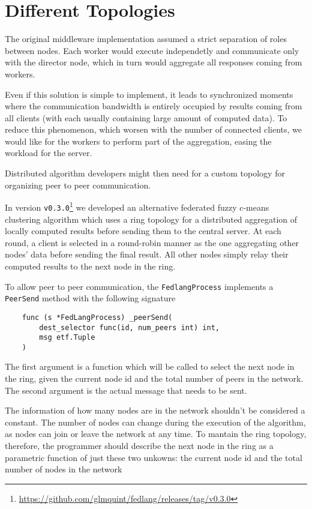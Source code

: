 \chapter{Different Topologies}

The original middleware implementation assumed a strict separation of roles between nodes. Each worker would execute independetly and communicate only with the director node, which in turn would aggregate all responses coming from workers.

Even if this solution is simple to implement, it leads to synchronized moments where the communication bandwidth is entirely occupied by results coming from all clients (with each usually containing large amount of computed data). To reduce this phenomenon, which worsen with the number of connected clients, we would like for the workers to perform part of the aggregation, easing the workload for the server. 

Distributed algorithm developers might then need for a custom topology for organizing peer to peer communication.

In version \texttt{v0.3.0}\footnote{\url{https://github.com/glmquint/fedlang/releases/tag/v0.3.0}} we developed an alternative federated fuzzy c-means clustering algorithm which uses a ring topology for a distributed aggregation of locally computed results before sending them to the central server. At each round, a client is selected in a round-robin manner as the one aggregating other nodes' data before sending the final result. All other nodes simply relay their computed results to the next node in the ring.

To allow peer to peer communication, the \texttt{FedlangProcess} implements a \texttt{PeerSend} method with the following signature

\begin{verbatim}
	func (s *FedLangProcess) _peerSend(
		dest_selector func(id, num_peers int) int, 
		msg etf.Tuple
	)
\end{verbatim}

The first argument is a function which will be called to select the next node in the ring, given the current node id and the total number of peers in the network. The second argument is the actual message that needs to be sent.

The information of how many nodes are in the network shouldn't be considered a constant. The number of nodes can change during the execution of the algorithm, as nodes can join or leave the network at any time. To mantain the ring topology, therefore, the programmer should describe the next node in the ring as a parametric function of just these two unkowns: the current node id and the total number of nodes in the network

